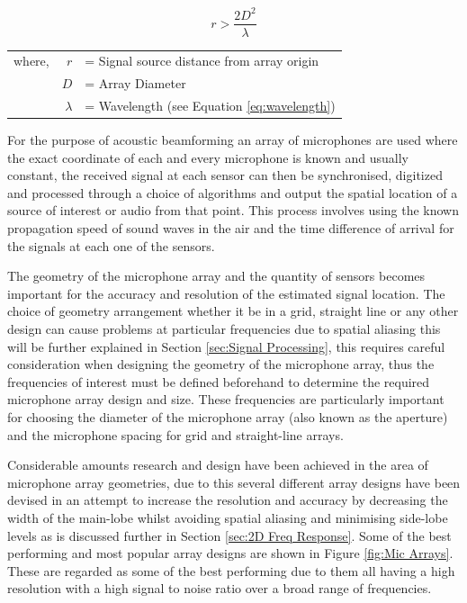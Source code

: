 \documentclass{UoNMCHA}
\numberwithin{equation}{section}
\begin{document}
    \begin{equation}
        r > \frac{2D^2}{\lambda}
        \label{eq:propogate}
    \end{equation}
    \begin{table}[H]
    \centering
        \begin{tabular}{lrl}
            where, & $r$ &= Signal source distance from array origin \\
             & $D$ &= Array Diameter \\
             & $\lambda$ &= Wavelength (see Equation \ref{eq:wavelength})
        \end{tabular}
    \end{table}
    
    For the purpose of acoustic beamforming an array of microphones are used where the exact coordinate of each and every microphone is known and usually constant, the received signal at each sensor can then be synchronised, digitized and processed through a choice of algorithms and output the spatial location of a source of interest or audio from that point. This process involves using the known propagation speed of sound waves in the air and the time difference of arrival for the signals at each one of the sensors.
    
    The geometry of the microphone array and the quantity of sensors becomes important for the accuracy and resolution of the estimated signal location. The choice of geometry arrangement whether it be in a grid, straight line or any other design can cause problems at particular frequencies due to spatial aliasing this will be further explained in Section \ref{sec:Signal Processing}, this requires careful consideration when designing the geometry of the microphone array, thus the frequencies of interest must be defined beforehand to determine the required microphone array design and size. These frequencies are particularly important for choosing the diameter of the microphone array (also known as the aperture) and the microphone spacing for grid and straight-line arrays.
    
    Considerable amounts research and design have been achieved in the area of microphone array geometries, due to this several different array designs have been devised in an attempt to increase the resolution and accuracy by decreasing the width of the main-lobe whilst avoiding spatial aliasing and minimising side-lobe levels as is discussed further in Section \ref{sec:2D Freq Response}. Some of the best performing and most popular array designs are shown in Figure \ref{fig:Mic Arrays}. These are regarded as some of the best performing due to them all having a high resolution with a high signal to noise ratio over a broad range of frequencies.
    
\end{document}
